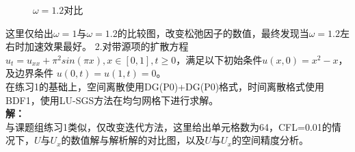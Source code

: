 \documentclass[a4paper,11pt,UTF8]{article}%
\theoremstyle{plain}
\begin{document}
	\begin{figure}[!h]
		\centering
		\hfill
		\caption{$\omega=1.2$对比}
	\end{figure}
   \indent 这里仅给出$\omega=1$与$\omega=1.2$的比较图，改变松弛因子的数值，最终发现当$\omega=1.2$左右时加速效果最好。
   \newpage
   \indent 2.对带源项的扩散方程$u_t=u_{xx}+\pi^2sin\left(\pi x\right), x\in \left[0,1\right],t\geq 0$，满足以下初始条件$u\left(x,0\right)=x^2-x$，及边界条件 $u\left(0,t\right)=u\left(1,t\right)=0$。\\
   \indent 在练习1的基础上，空间离散使用DG(P0)+DG(P0)格式，时间离散格式使用BDF1，使用LU-SGS方法在均匀网格下进行求解。
   	\vspace{10pt}\\
   \textbf{解：}\\
   \indent 与课题组练习1类似，仅改变迭代方法，这里给出单元格数为64，CFL=0.01的情况下，$U$与$U_x$的数值解与解析解的对比图，以及$U$与$U_x$的空间精度分析。\\
\end{document}
